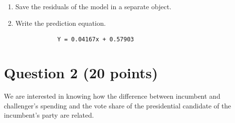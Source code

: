 \documentclass[12pt,letterpaper]{article}
\begin{document}
\begin{enumerate}
		\item Save the residuals of the model in a separate object.	
		
		
		\item Write the prediction equation.
			\begin{verbatim}
			Y = 0.04167x + 0.57903
			\end{verbatim}
	\end{enumerate}
	
\newpage

\section*{Question 2 (20 points)}
\noindent We are interested in knowing how the difference between incumbent and challenger's spending and the vote share of the presidential candidate of the incumbent's party are related.	\vspace{.25cm}
\end{document}
